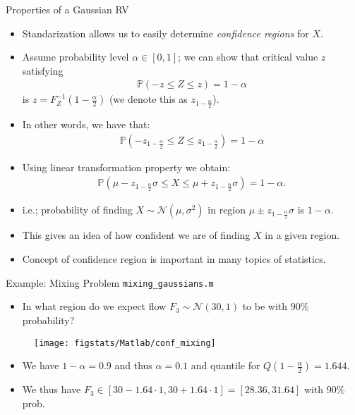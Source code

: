 \documentclass[handout,9pt]{beamer}
\begin{document}
%
\begin{frame}{Properties of a Gaussian RV}

\begin{itemize}
\setlength{\itemsep}{10pt}
\item Standarization allows us to easily determine {\em confidence regions} for $X$.

\item Assume probability level $\alpha \in [0,1]$; we can show that critical value $z$ satisfying
\begin{align*}
\mathbb{P}(-z\leq Z\leq z)=1-\alpha
\end{align*}
is $z=F_Z^{-1}(1-\frac{\alpha}{2})$ (we denote this as $z_{1-\frac{\alpha}{2}}$). 
\item In other words, we have that:
\begin{align*}
\mathbb{P}(-z_{1-\frac{\alpha}{2}}\leq Z\leq z_{1-\frac{\alpha}{2}})=1-\alpha
\end{align*} 
\item Using linear transformation property we obtain:
\begin{align*}
\mathbb{P}(\mu-z_{1-\frac{\alpha}{2}}\sigma\leq X\leq \mu+z_{1-\frac{\alpha}{2}}\sigma)=1-\alpha.
\end{align*}
\item i.e.; probability of finding $X\sim\mathcal{N}(\mu,\sigma^2)$ in region $\mu\pm z_{1-\frac{\alpha}{2}}\sigma$ is $1-\alpha$. 
\item This gives an idea of how confident we are of finding $X$ in a given region.

\item Concept of confidence region is important in many topics of statistics. 
\end{itemize}
\end{frame}

\begin{frame}{Example: Mixing Problem \footnotesize{\texttt{mixing\_gaussians.m}}}
\begin{itemize}
\item In what region do we expect flow $F_3\sim\mathcal{N}(30,1)$ to be with 90\% probability? 
\end{itemize}
\begin{figure}[!htb]
    \centering
	\texttt{[image: figstats/Matlab/conf\_mixing]}
\end{figure}
\begin{itemize}
\item We have $1-\alpha=0.9$ and thus $\alpha=0.1$ and quantile for $Q(1-\frac{\alpha}{2})=1.644$.
\item We thus have $F_3\in [30-1.64\cdot 1,30+1.64\cdot 1]=[28.36,31.64]$ with 90\% prob. 
\end{itemize}
\end{frame}
\end{document}
